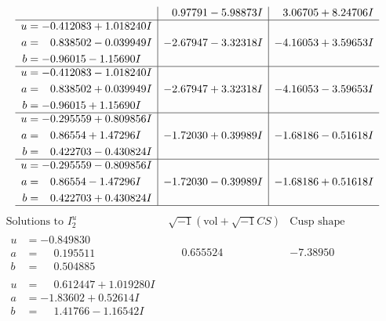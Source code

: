 \documentclass[1p]{elsarticle_modified}
\theoremstyle{definition}
\newcommand{\I}{\sqrt{-1}}
\begin{document}
$$\begin{array}{c|c|c}
 & \phantom{-}0.97791 - 5.98873 I & \phantom{-}3.06705 + 8.24706 I \\ \hline\begin{aligned}
u &= -0.412083 + 1.018240 I \\
a &= \phantom{-}0.838502 - 0.039949 I \\
b &= -0.96015 - 1.15690 I\end{aligned}
 & -2.67947 - 3.32318 I & -4.16053 + 3.59653 I \\ \hline\begin{aligned}
u &= -0.412083 - 1.018240 I \\
a &= \phantom{-}0.838502 + 0.039949 I \\
b &= -0.96015 + 1.15690 I\end{aligned}
 & -2.67947 + 3.32318 I & -4.16053 - 3.59653 I \\ \hline\begin{aligned}
u &= -0.295559 + 0.809856 I \\
a &= \phantom{-}0.86554 + 1.47296 I \\
b &= \phantom{-}0.422703 - 0.430824 I\end{aligned}
 & -1.72030 + 0.39989 I & -1.68186 - 0.51618 I \\ \hline\begin{aligned}
u &= -0.295559 - 0.809856 I \\
a &= \phantom{-}0.86554 - 1.47296 I \\
b &= \phantom{-}0.422703 + 0.430824 I\end{aligned}
 & -1.72030 - 0.39989 I & -1.68186 + 0.51618 I\\
 \hline 
 \end{array}$$\newpage$$\begin{array}{c|c|c}  
\text{Solutions to }I^u_{2}& \I (\text{vol} + \sqrt{-1}CS) & \text{Cusp shape}\\
 \hline 
\begin{aligned}
u &= -0.849830\phantom{ +0.000000I} \\
a &= \phantom{-}0.195511\phantom{ +0.000000I} \\
b &= \phantom{-}0.504885\phantom{ +0.000000I}\end{aligned}
 & \phantom{-}0.655524\phantom{ +0.000000I} & -7.38950\phantom{ +0.000000I} \\ \hline\begin{aligned}
u &= \phantom{-}0.612447 + 1.019280 I \\
a &= -1.83602 + 0.52614 I \\
b &= \phantom{-}1.41766 - 1.16542 I\end{aligned}

\end{array}$$
\end{document}
